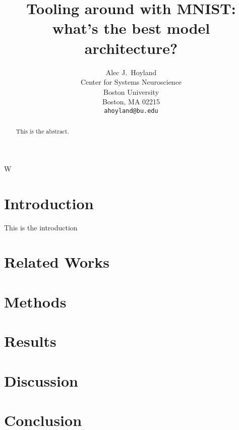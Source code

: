 \documentclass{article}
\title{Tooling around with MNIST: what's the best model architecture?}
\author{%
  Alec J.~Hoyland \\
  Center for Systems Neuroscience\\
  Boston University\\
  Boston, MA 02215 \\
  \texttt{ahoyland@bu.edu} \\
}
\begin{document}
\maketitle

\begin{abstract}
  This is the abstract.
\end{abstract}W

\section{Introduction}

This is the introduction

\section{Related Works}

\section{Methods}

\section{Results}

\section{Discussion}

\section{Conclusion}
\end{document}
